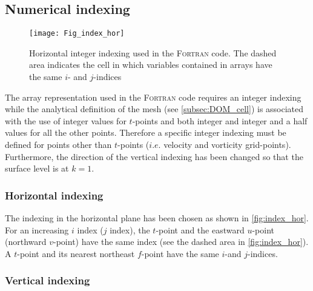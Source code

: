 \documentclass[../tex_main/NEMO_manual]{subfiles}
\begin{document}
\subsection{Numerical indexing}
\label{subsec:DOM_Num_Index}

\begin{figure}[!tb]  \begin{center}
\texttt{[image: Fig\_index\_hor]}
\caption{   \protect\label{fig:index_hor}    
Horizontal integer indexing used in the \textsc{Fortran} code. The dashed area indicates 
the cell in which variables contained in arrays have the same $i$- and $j$-indices}
\end{center}   \end{figure}

The array representation used in the \textsc{Fortran} code requires an integer 
indexing while the analytical definition of the mesh (see \autoref{subsec:DOM_cell}) is 
associated with the use of integer values for $t$-points and both integer and 
integer and a half values for all the other points. Therefore a specific integer 
indexing must be defined for points other than $t$-points ($i.e.$ velocity and 
vorticity grid-points). Furthermore, the direction of the vertical indexing has 
been changed so that the surface level is at $k=1$.

\subsubsection{Horizontal indexing}
\label{subsec:DOM_Num_Index_hor}

The indexing in the horizontal plane has been chosen as shown in \autoref{fig:index_hor}. 
For an increasing $i$ index ($j$ index), the $t$-point and the eastward $u$-point 
(northward $v$-point) have the same index (see the dashed area in \autoref{fig:index_hor}). 
A $t$-point and its nearest northeast $f$-point have the same $i$-and $j$-indices.

\subsubsection{Vertical indexing}
\label{subsec:DOM_Num_Index_vertical}
\end{document}

